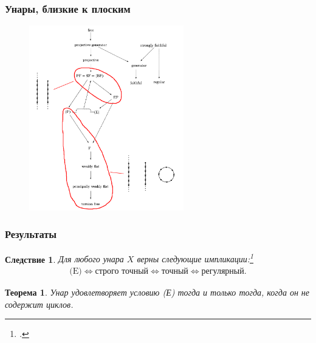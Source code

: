 \documentclass[11pt, notheorems]{beamer}
\newtheorem{theorem}{Теорема}
\newtheorem{corollary}{Следствие}
\begin{document}
\begin{frame}
	\frametitle{Унары, близкие к плоским}

	\begin{figure}
		\center
		\includegraphics[width=0.6\textwidth]{overview_4.png}
	\end{figure}
\end{frame}

\begin{frame}
	\frametitle{Результаты}

	\begin{corollary}
		Для любого унара $X$ верны следующие импликации:\footcite[следствие 4]{pryan:unars_close_to_flat}
		\begin{gather*}
			\text{(E)} \Leftrightarrow \text{строго точный} \Leftrightarrow \text{точный} \Leftrightarrow \text{регулярный.}
		\end{gather*}
	\end{corollary}

	\begin{theorem}
		Унар удовлетворяет условию (Е) тогда и только тогда, когда он не содержит циклов.
	\end{theorem}
\end{frame}
\end{document}
